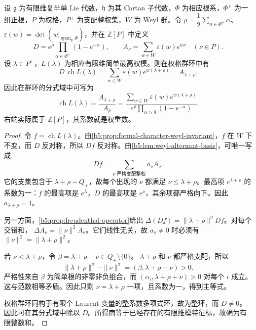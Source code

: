 \begin{theorem}\label{b5:thm:weyl-character}
	设 \(\mathfrak g\) 为有限维复半单 Lie 代数，\(\mathfrak h\) 为其 Cartan 子代数，\(\Phi\) 为相应根系，\(\Phi^+\) 为一组正根，\(P\) 为权格，\(P^+\) 为支配整权集，\(W\) 为 Weyl 群。令 \(\rho=\dfrac12\sum_{\alpha\in\Phi^+}\alpha\)、\(\varepsilon(w)=\det(w|_{\operatorname{span}_{\mathbb R}\Phi})\)，并在 \(\mathbb Z[P]\) 中定义
	\[
		D=e^\rho\prod_{\alpha\in\Phi^+}(1-e^{-\alpha}),\qquad A_\nu=\sum_{w\in W}\varepsilon(w)e^{w\nu}\quad(\nu\in P).
	\]
	设 \(\lambda\in P^+\)，\(L(\lambda)\) 为相应有限维简单最高权模。则在权格群环中有
	\begin{equation}\label{b5:eq:weyl-character}
		D\,\operatorname{ch}L(\lambda) =\sum_{w\in W}\varepsilon(w)e^{w(\lambda+\rho)}=A_{\lambda+\rho}.
	\end{equation}
	因此在群环的分式域中可写为
	\[
		\operatorname{ch}L(\lambda) =\frac{A_{\lambda+\rho}}{A_\rho} =\frac{\sum_{w\in W}\varepsilon(w)e^{w(\lambda+\rho)}} {e^\rho\prod_{\alpha>0}(1-e^{-\alpha})}.
	\]
	右端实际属于 \(\mathbb Z[P]\)，其系数就是权重数。
\end{theorem}
\begin{proof}
	令 \(f=\operatorname{ch}L(\lambda)\)。由\cref{b5:prop:formal-character-weyl-invariant}，\(f\) 在 \(W\) 下不变，而 \(D\) 反对称，所以 \(Df\) 反对称。由\cref{b5:lem:weyl-alternant-basis}，可唯一写成
	\[
		Df=\sum_{\nu\text{ 严格支配整权}}a_\nu A_\nu.
	\]
	它的支集包含于 \(\lambda+\rho-Q_+\)，故每个出现的 \(\nu\) 都满足 \(\nu\le\lambda+\rho\)。最高项 \(e^{\lambda+\rho}\) 的系数为一：\(f\) 的最高项是 \(e^\lambda\)，\(D\) 的最高项是 \(e^\rho\)，其余项都严格向下。因此 \(a_{\lambda+\rho}=1\)。

	另一方面，\cref{b5:prop:freudenthal-operator}给出 \(\Delta(Df)=\|\lambda+\rho\|^2Df\)。对每个交错和， \(\Delta A_\nu=\|\nu\|^2A_\nu\)。它们线性无关，故 \(a_\nu\ne0\) 时必须有 \(\|\nu\|^2=\|\lambda+\rho\|^2\)。

	若 \(\nu<\lambda+\rho\)，令 \(\beta=\lambda+\rho-\nu\in Q_+\setminus\{0\}\)。 \(\lambda+\rho\) 和 \(\nu\) 都严格支配，所以
	\[
		\|\lambda+\rho\|^2-\|\nu\|^2 =(\beta,\lambda+\rho+\nu)>0.
	\]
	严格性来自 \(\beta\) 为简单根的非零非负组合，而 \((\alpha_i,\lambda+\rho+\nu)>0\) 对每个 \(i\) 成立。 这与范数相等矛盾。因此只剩 \(\nu=\lambda+\rho\) 一项，且系数为一，得到主等式。

	权格群环同构于有限个 Laurent 变量的整系数多项式环，故为整环，而 \(D\ne0\)。因此可在其分式域中除以 \(D\)。所得商等于已经存在的有限维模特征标，故确为有限整数和。
\end{proof}

